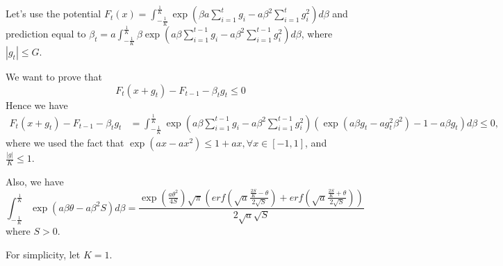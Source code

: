 \documentclass{colt2016_empty} %
\begin{document}
Let's use the potential $F_t(x)=\int_{-\tfrac{1}{K}}^{\tfrac{1}{K}} \exp(\beta a \sum_{i=1}^t g_i - a \beta^2 \sum_{i=1}^t g_i^2) d\beta$ and prediction equal to $\beta_{t}=a \int_{-\tfrac{1}{K}}^{\tfrac{1}{K}} \beta \exp(a \beta \sum_{i=1}^{t-1} g_i - a \beta^2 \sum_{i=1}^{t-1} g_i^2) d\beta$, where $|g_t|\leq G$.

We want to prove that
\[
F_t(x+g_t) - F_{t-1} -\beta_t g_t \leq 0
\]
Hence we have
\begin{align}
F_t(x+g_t) - F_{t-1} -\beta_t g_t 
&=\int_{-\tfrac{1}{K}}^{\tfrac{1}{K}} \exp(a \beta \sum_{i=1}^{t-1} g_i - a \beta^2 \sum_{i=1}^{t-1} g_i^2)(\exp(a \beta g_t-a g_t^2 \beta^2) -1 - a \beta g_t) d\beta \leq 0,
\end{align}
where we used the fact that $\exp(a x-a x^2)\leq 1+ a x, \forall x\in[-1,1]$, and $\frac{|g|}{K}\leq 1$.

Also, we have
\[
\int_{-\tfrac{1}{K}}^{\tfrac{1}{K}} \exp(a \beta \theta - a \beta^2 S) d\beta 
= \frac{\exp(\frac{a \theta^2}{4 S}) \sqrt{\pi} (erf(\sqrt{a}\frac{\frac{2 S}{K}-\theta}{2 \sqrt{S}})+erf(\sqrt{a}\frac{\frac{2 S}{K}+\theta}{2 \sqrt{S}}))}{2 \sqrt{a} \sqrt{S}}
\]
where $S>0$.

For simplicity, let $K=1$.
\end{document}

